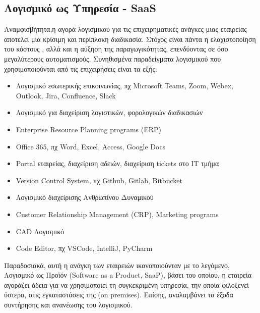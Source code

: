 \documentclass{article}
\begin{document}
\subsection{Λογισμικό ως Υπηρεσία - SaaS}
Αναμφισβήτητα,η αγορά λογισμικού για τις επιχειρηματικές ανάγκες μιας εταιρείας αποτελεί μια κρίσιμη και περίπλοκη διαδικασία. Στόχος είναι πάντα η ελαχιστοποίηση του κόστους , αλλά και η αύξηση της παραγωγικότητας, επενδύοντας σε όσο μεγαλύτερους αυτοματισμούς. Συνηθισμένα παραδείγματα λογισμικού που χρησιμοποιούνται από τις επιχειρήσεις είναι τα εξής:
\begin{itemize}
  \item Λογισμικό εσωτερικής επικοινωνίας, πχ  Microsoft Teams, Zoom, Webex, Outlook, Jira, Confluence, Slack
  \item Λογισμικό για διαχείριση λογιστικών, φορολογικών διαδικασιών
  \item {} Enterprise Resource Planning programs (ERP)
  \item Office 365, πχ Word, Excel, Access, Google Docs
  \item Portal  εταιρείας, διαχείριση αδειών, διαχείριση tickets στο ΙΤ τμήμα 
  \item Version Control System, πχ Github, Gitlab, Bitbucket 
  \item Λογισμικό διαχείρισης Ανθρωπίνου Δυναμικού 
  \item Customer Relationship Management (CRP), Marketing programs
  \item CAD Λογισμικό
  \item Code Editor, πχ VSCode, IntelliJ, PyCharm
\end{itemize}
Παραδοσιακά, αυτή η ανάγκη των εταιρειών ικανοποιούνταν με το λεγόμενο, Λογισμικό ως Προϊόν (Software as a Product, SaaP), βάσει του οποίου, η εταιρεία αγοράζει άδεια για να χρησιμοποιεί τη συγκεκριμένη υπηρεσία, την οποία φιλοξενεί ύστερα, στις εγκαταστάσεις της (on premises). Επίσης, αναλαμβάνει τα έξοδα συντήρησης και ανανέωσης του λογισμικού. \\ \\
\end{document}
